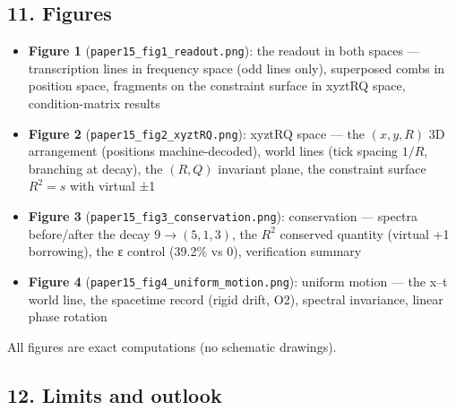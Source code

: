 \documentclass[
]{ltjsarticle}
\providecommand{\tightlist}{%
  \setlength{\itemsep}{0pt}\setlength{\parskip}{0pt}}
\begin{document}
\subsection{11. Figures}\label{figures}

\begin{itemize}
\tightlist
\item
  \textbf{Figure 1} (\texttt{paper15\_fig1\_readout.png}): the readout
  in both spaces --- transcription lines in frequency space (odd lines
  only), superposed combs in position space, fragments on the constraint
  surface in xyztRQ space, condition-matrix results
\item
  \textbf{Figure 2} (\texttt{paper15\_fig2\_xyztRQ.png}): xyztRQ space
  --- the \((x,y,R)\) 3D arrangement (positions machine-decoded), world
  lines (tick spacing \(1/R\), branching at decay), the \((R,Q)\)
  invariant plane, the constraint surface \(R^2=s\) with virtual ±1
\item
  \textbf{Figure 3} (\texttt{paper15\_fig3\_conservation.png}):
  conservation --- spectra before/after the decay \(9\to(5,1,3)\), the
  \(R^2\) conserved quantity (virtual +1 borrowing), the ε control
  (39.2\% vs 0), verification summary
\item
  \textbf{Figure 4} (\texttt{paper15\_fig4\_uniform\_motion.png}):
  uniform motion --- the x--t world line, the spacetime record (rigid
  drift, O2), spectral invariance, linear phase rotation
\end{itemize}

All figures are exact computations (no schematic drawings).

\subsection{12. Limits and outlook}\label{limits-and-outlook}
\end{document}

